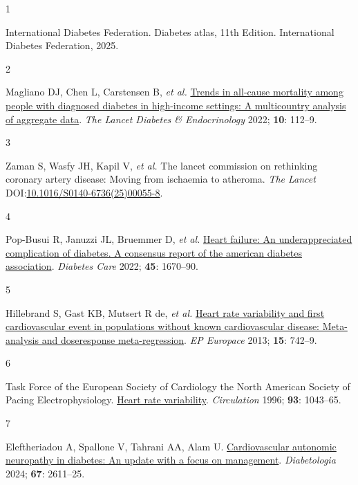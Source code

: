 \documentclass[
  a4paper,
  headsepline=true,
  open=any]{scrbook}
\newlength{\cslhangindent}
\newlength{\csllabelwidth}
\newlength{\cslentryspacingunit} %
\newenvironment{CSLReferences}[2] %
 {%
  \setlength{\parindent}{0pt}
  \ifodd #1
  \let\oldpar\par
  \def\par{\hangindent=\cslhangindent\oldpar}
  \fi
  \setlength{\parskip}{#2\cslentryspacingunit}
 }%
 {}
\newcommand{\CSLLeftMargin}[1]{\parbox[t]{\csllabelwidth}{#1}}
\newcommand{\CSLRightInline}[1]{\parbox[t]{\linewidth - \csllabelwidth}{#1}\break}
\begin{document}
\hypertarget{refs}{}
\begin{CSLReferences}{0}{0}
\leavevmode{}%
\CSLLeftMargin{1 }%
\CSLRightInline{International Diabetes Federation. Diabetes atlas, 11th
Edition. International Diabetes Federation, 2025.}

\leavevmode{}%
\CSLLeftMargin{2 }%
\CSLRightInline{Magliano DJ, Chen L, Carstensen B, \emph{et al.}
\href{https://doi.org/10.1016/S2213-8587(21)00327-2}{Trends in all-cause
mortality among people with diagnosed diabetes in high-income settings:
A multicountry analysis of aggregate data}. \emph{The Lancet Diabetes \&
Endocrinology} 2022; \textbf{10}: 112--9.}

\leavevmode{}%
\CSLLeftMargin{3 }%
\CSLRightInline{Zaman S, Wasfy JH, Kapil V, \emph{et al.} The lancet
commission on rethinking coronary artery disease: Moving from ischaemia
to atheroma. \emph{The Lancet}
DOI:\href{https://doi.org/10.1016/S0140-6736(25)00055-8}{10.1016/S0140-6736(25)00055-8}.}

\leavevmode{}%
\CSLLeftMargin{4 }%
\CSLRightInline{Pop-Busui R, Januzzi JL, Bruemmer D, \emph{et al.}
\href{https://doi.org/10.2337/dci22-0014}{Heart failure: An
underappreciated complication of diabetes. A consensus report of the
american diabetes association}. \emph{Diabetes Care} 2022; \textbf{45}:
1670--90.}

\leavevmode{}%
\CSLLeftMargin{5 }%
\CSLRightInline{Hillebrand S, Gast KB, Mutsert R de, \emph{et al.}
\href{https://doi.org/10.1093/europace/eus341}{Heart rate variability
and first cardiovascular event in populations without known
cardiovascular disease: Meta-analysis and dose{\textendash}response
meta-regression}. \emph{EP Europace} 2013; \textbf{15}: 742--9.}

\leavevmode{}%
\CSLLeftMargin{6 }%
\CSLRightInline{Task Force of the European Society of Cardiology the
North American Society of Pacing Electrophysiology.
\href{https://doi.org/doi:10.1161/01.CIR.93.5.1043}{Heart rate
variability}. \emph{Circulation} 1996; \textbf{93}: 1043--65.}

\leavevmode{}%
\CSLLeftMargin{7 }%
\CSLRightInline{Eleftheriadou A, Spallone V, Tahrani AA, Alam U.
\href{https://doi.org/10.1007/s00125-024-06242-0}{Cardiovascular
autonomic neuropathy in diabetes: An update with a focus on management}.
\emph{Diabetologia} 2024; \textbf{67}: 2611--25.}


\end{CSLReferences}
\end{document}
